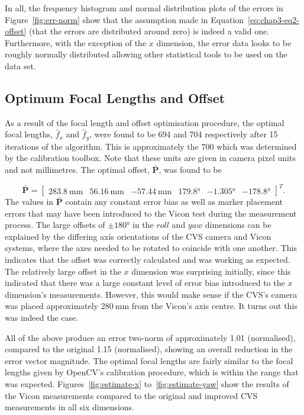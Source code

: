 In all, the frequency histogram and normal distribution plots of the errors in Figure~\ref{fig:err-norm} show that the assumption made in Equation~\ref{eq:chap3-eq2-offset} (that the errors are distributed around zero) is indeed a valid one. Furthermore, with the exception of the $x$ dimension, the error data looks to be roughly normally distributed allowing other statistical tools to be used on the data set. 

\subsection{Optimum Focal Lengths and Offset}

As a result of the focal length and offset optimisation procedure, the optimal focal lengths, $\hat{f}_x$ and $\hat{f}_y$, were found to be 694 and 704 respectively after 15 iterations of the algorithm. This is approximately the 700 which was determined by the calibration toolbox. Note that these units are given in camera pixel units and not millimetres. The optimal offset, $\bar{\bm{P}}$, was found to be 

\begin{equation}
  \label{eq:chap3-offset-value}
  \bar{\bm{P}} = 
  \begin{bmatrix}
    \SI{283.8}{\mm} & \SI{56.16}{\mm} & \SI{-57.44}{\mm} & \ang{179.8} & \ang{-1.305} & \ang{-178.8}
  \end{bmatrix}^T.
\end{equation}
The values in $\bar{\bm{P}}$ contain any constant error bias as well as marker placement errors that may have been introduced to the Vicon test during the measurement process. The large offsets of $\pm\ang{180}$ in the $roll$ and $yaw$ dimensions can be explained by the differing axis orientations of the CVS camera and Vicon systems, where the axes needed to be rotated to coincide with one another. This indicates that the offset was correctly calculated and was working as expected. The relatively large offset in the $x$ dimension was surprising initially, since this indicated that there was a large constant level of error bias introduced to the $x$ dimension's measurements. However, this would make sense if the CVS's camera was placed approximately $\SI{280}{\mm}$ from the Vicon's axis centre. It turns out this was indeed the case. 

All of the above produce an error two-norm of approximately 1.01 (normalised), compared to the original 1.15 (normalised), showing an overall reduction in the error vector magnitude. The optimal focal lengths are fairly similar to the focal lengths given by OpenCV's calibration procedure, which is within the range that was expected. Figures~\ref{fig:estimate-x} to~\ref{fig:estimate-yaw} show the results of the Vicon measurements compared to the original and improved CVS measurements in all six dimensions.

